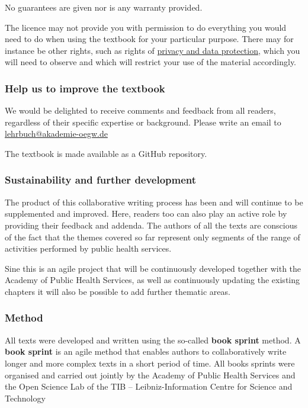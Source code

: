 \documentclass{article}
\begin{document}
No guarantees are given nor is any warranty provided.


The licence may not provide you with permission to do everything you would need to do when using the textbook for your particular purpose. There may for instance be other rights, such as rights of \href{https://creativecommons.org/licenses/by-sa/4.0/legalcode}{privacy and data protection}, which you will need to observe and which will restrict your use of the material accordingly.


\subsubsection{Help us to improve the textbook}\label{H7096628}



We would be delighted to receive comments and feedback from all readers, regardless of their specific expertise or background. Please write an email to \href{mailto:Tinnemann@akademie-oegw.de}{lehrbuch@akademie-oegw.de}


The textbook is made available as a GitHub repository.


\subsubsection{Sustainability and further development}\label{H2766812}



The product of this collaborative writing process has been and will continue to be supplemented and improved. Here, readers too can also play an active role by providing their feedback and addenda. The authors of all the texts are conscious of the fact that the themes covered so far represent only segments of the range of activities performed by public health services.


Sine this is an agile project that will be continuously developed together with the Academy of Public Health Services, as well as continuously updating the existing chapters it will also be possible to add further thematic areas.


\subsubsection{Method}\label{H99013}



All texts were developed and written using the so-called \textbf{book sprint} method. A \textbf{book sprint} is an agile method that enables authors to collaboratively write longer and more complex texts in a short period of time. All books sprints were organised and carried out jointly by the Academy of Public Health Services and the Open Science Lab of the TIB – Leibniz-Information Centre for Science and Technology
\end{document}
